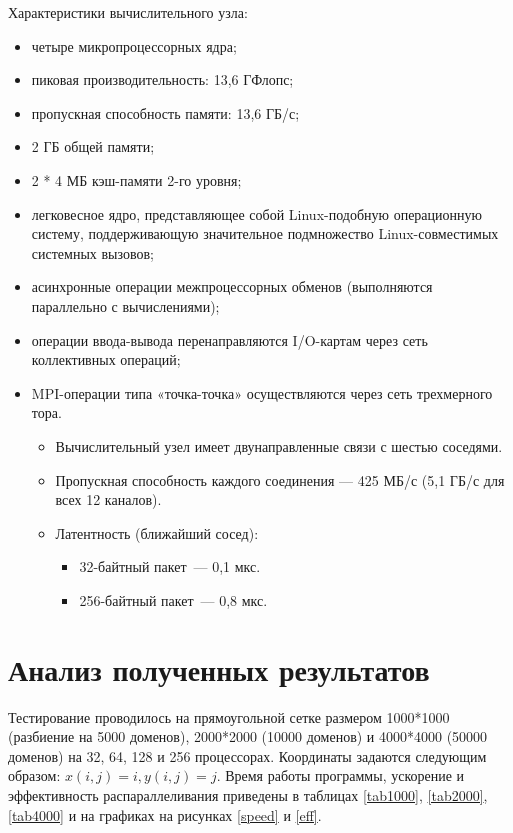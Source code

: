 \documentclass[oneside,final,14pt]{extreport}
\begin{document}
Характеристики вычислительного узла:

\begin{itemize}
    \item четыре микропроцессорных ядра;
    \item пиковая производительность: 13,6 ГФлопс;
    \item пропускная способность памяти: 13,6 ГБ/с;
    \item 2 ГБ общей памяти;
    \item 2 * 4 МБ кэш-памяти 2-го уровня;
    \item легковесное ядро, представляющее собой Linux-подобную операционную систему,
        поддерживающую значительное подмножество Linux-совместимых системных вызовов;
    \item асинхронные операции межпроцессорных обменов (выполняются параллельно с вычислениями);
    \item операции ввода-вывода перенаправляются I/O-картам через сеть коллективных операций;
    \item MPI-операции типа «точка-точка» осуществляются через сеть трехмерного тора.
        \begin{itemize}
            \item Вычислительный узел имеет двунаправленные связи с шестью соседями.
            \item Пропускная способность каждого соединения — 425 МБ/с (5,1 ГБ/с для всех 12
        каналов).
            \item Латентность (ближайший сосед):
                \begin{itemize}
                    \item 32-байтный пакет~--- 0,1 мкс.
                    \item 256-байтный пакет~--- 0,8 мкс.
                \end{itemize}
        \end{itemize}
\end{itemize}


\chapter*{Анализ полученных результатов}

Тестирование проводилось на прямоугольной сетке размером
1000*1000 (разбиение на 5000 доменов), 2000*2000 (10000 доменов) и
4000*4000 (50000 доменов) на 32, 64, 128 и 256 процессорах.
Координаты задаются следующим образом: $x(i,j) = i, y(i, j) = j$.
Время работы программы, ускорение и эффективность
распараллеливания приведены в таблицах \ref{tab1000}, \ref{tab2000},
\ref{tab4000} и на графиках на рисунках \ref{speed} и \ref{eff}.
\end{document}
